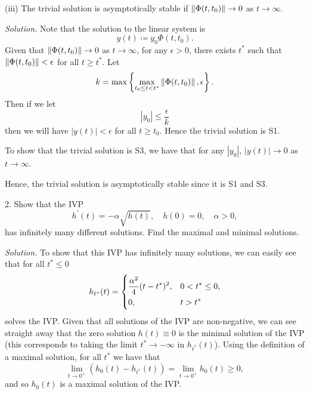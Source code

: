 \documentclass{article}
\begin{document}
\vspace{5mm}

(iii) The trivial solution is asymptotically stable if
$\enVert[0]{\Phi(t, t_0)} \to 0$ as $t \to \infty$.

\textit{Solution.}
Note that the solution to the linear system is
%
\begin{equation*}
    y(t) \coloneqq y_0 \Phi(t, t_0)
    .
\end{equation*}
%
Given that $\enVert[0]{\Phi(t, t_0)} \to 0$ as $t \to \infty$, for any $\epsilon > 0$,
there exists $t^*$ such that $\enVert[0]{\Phi(t, t_0)} < \epsilon$ for all $t \geq t^*$.
Let
%
\begin{equation*}
    k = \max\cbr{\max_{t_0 \leq t < t^*} \enVert[0]{\Phi(t, t_0)}, \epsilon}
    .
\end{equation*}
%
Then if we let
%
\begin{equation*}
    |y_0| \leq \frac{\epsilon}{k}
\end{equation*}
%
then we will have $|y(t)| < \epsilon$ for all $t \geq t_0$.
Hence the trivial solution is S1.

To show that the trivial solution is S3, we have that for any $|y_0|$,
$|y(t)| \to 0$ as $t \to \infty$.

Hence, the trivial solution is asymptotically stable since it is S1 and S3.

\newpage

2. Show that the IVP
%
\begin{equation*}
    h^\prime(t) = - \alpha \sqrt{h(t)}, \quad h(0) = 0, \quad \alpha > 0,
\end{equation*}
%
has infinitely many different solutions. Find the maximal and minimal solutions.

\textit{Solution.}
To show that this IVP has infinitely many solutions, we can easily see that for all $t^* \leq 0$
%
\begin{equation*}
    h_{t^*}(t) =
    \begin{dcases}
        \frac{\alpha^2}{4} (t - t^*)^2, & 0 < t^* \leq 0, \\
        0, & t > t^*
    \end{dcases}
\end{equation*}
%
solves the IVP. Given that all solutions of the IVP are non-negative, we can see straight away
that the zero solution $h(t) \equiv 0$ is the minimal solution of the
IVP (this corresponds to taking the limit $t^* \to - \infty$ in
$h_{t^*}(t)$). Using the definition of a maximal solution,
for all $t^*$ we have that
%
\begin{equation*}
    \lim_{t \to 0^+} (h_0(t) - h_{t^*}(t)) = \lim_{t \to 0^+} h_0(t) \geq 0
    ,
\end{equation*}
%
and so $h_0(t)$ is a maximal solution of the IVP.
\end{document}
